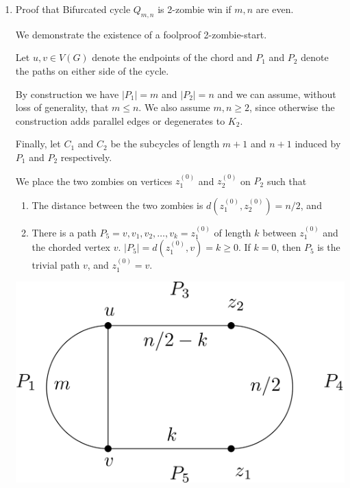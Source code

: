 \documentclass[letterpaper, 10pt]{article}
\begin{document}
\begin{enumerate}

 \item Proof that Bifurcated cycle $Q_{m,n}$ is 2-zombie win if $m, n$ are even.

       We demonstrate the existence of a foolproof 2-zombie-start.

       Let $u,v \in V(G)$ denote the endpoints of the chord and $P_1$ and $P_2$ denote the paths
       on either side of the cycle.

       By construction we have $\vert P_1 \vert = m$ and $\vert P_2 \vert = n$ and we
       can assume, without loss of generality, that $m \leq n$. We also assume $m,n \geq 2$, since
       otherwise the construction adds parallel edges or degenerates to $K_2$.

       Finally, let $C_1$ and $C_2$ be the subcycles of length $m+1$ and $n+1$ induced by
       $P_1$ and $P_2$ respectively.

       We place the two zombies on vertices $z_1^{(0)}$ and $z_2^{(0)}$ on $P_2$ such that

       \begin{enumerate}
        \item The distance between the two zombies is $d(z_1^{(0)}, z_2^{(0)}) = n/2$,  and
        \item There is a path $P_5 = v, v_1, v_2, \dots, v_k = z_1^{(0)}$ of length $k$ between $z_1^{(0)}$ and
              the chorded vertex $v$. $\vert P_5 \vert = d(z_1^{(0)}, v) = k \geq 0$.
              If $k=0$, then $P_5$ is the trivial path $v$, and $z_1^{(0)} = v$.
       \end{enumerate}

       \begin{center}
        \includegraphics[scale=0.15]{diagram1.png}
       \end{center}



\end{enumerate}
\end{document}
